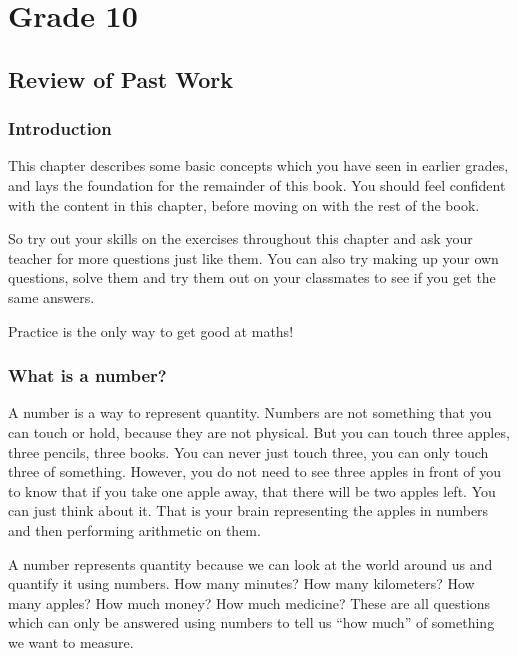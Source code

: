 \documentclass[10pt,a4paper,titlepage,twoside,openright]{report}
\begin{document}




\part{Grade 10}


\chapter{Review of Past Work}
\label{mfoundation}

\section{Introduction}
This chapter describes some basic concepts which you have seen in earlier grades, and lays the foundation for the remainder of this book. You should feel confident with the content in this chapter, before moving on with the rest of the book. 

So try out your skills on the exercises throughout this chapter and ask your teacher for more questions just like them. You can also try making up your own questions, solve them and try them out on your classmates to see if you get the same answers.

Practice is the only way to get good at maths!


\section{What is a number?}
A number is a way to represent quantity. Numbers are not something that you can touch or hold, because they are not physical. But you can touch three apples, three pencils, three books. You can never just touch three, you can only touch three of something. However, you do not need to see three apples in front of you to know that if you take one apple away, that there will be two apples left. You can just think about it. That is your brain representing the apples in numbers and then performing arithmetic on them.

A number represents quantity because we can look at the world around us and
quantify it using numbers. How many minutes? How many kilometers? How
many apples? How much money? How much medicine? These are all questions which can only be answered using numbers to tell us ``how much'' of something we want to measure.
\end{document}
